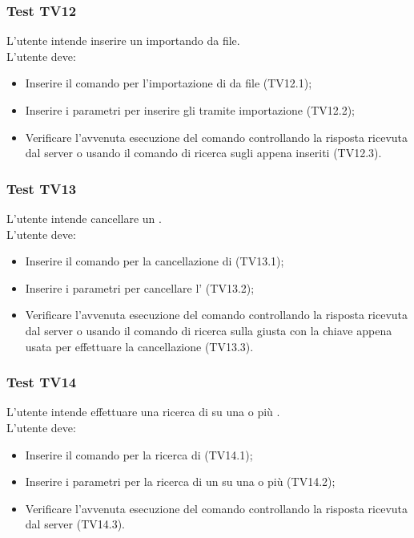 \documentclass{scalatekids-article}
\begin{document}
\subsubsection{Test TV12}

L'utente intende inserire un  importando da file.\\
L'utente deve:
\begin{itemize}
\item Inserire il comando per l'importazione di  da file (TV12.1);
\item Inserire i parametri per inserire gli  tramite importazione (TV12.2);
\item Verificare l'avvenuta esecuzione del comando controllando la risposta ricevuta dal server o usando il comando di ricerca sugli  appena inseriti (TV12.3).
\end{itemize}

\subsubsection{Test TV13}

L'utente intende cancellare un .\\
L'utente deve:
\begin{itemize}
\item Inserire il comando per la cancellazione di  (TV13.1);
\item Inserire i parametri per cancellare l' (TV13.2);
\item Verificare l'avvenuta esecuzione del comando controllando la risposta ricevuta dal server o usando il comando di ricerca sulla  giusta con la chiave appena usata per effettuare la cancellazione (TV13.3).
\end{itemize}

\subsubsection{Test TV14}

L'utente intende effettuare una ricerca di  su una o più .\\
L'utente deve:
\begin{itemize}
\item Inserire il comando per la ricerca di  (TV14.1);
\item Inserire i parametri per la ricerca di un  su una o più  (TV14.2);
\item Verificare l'avvenuta esecuzione del comando controllando la risposta ricevuta dal server (TV14.3).
\end{itemize}
\end{document}
